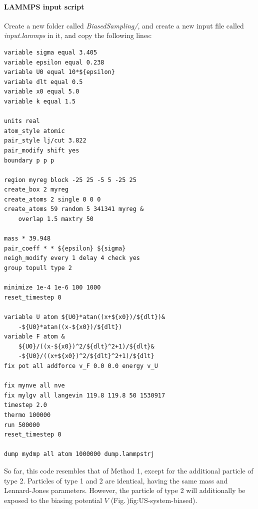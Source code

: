 \documentclass[9pt,tutorial]{livecoms}
\begin{document}
\paragraph{LAMMPS input script}
Create a new folder called \textit{BiasedSampling/}, and create a new input file called \textit{input.lammps} in it, and copy the following lines:
{\normalsize \begin{verbatim}
variable sigma equal 3.405
variable epsilon equal 0.238
variable U0 equal 10*${epsilon}
variable dlt equal 0.5
variable x0 equal 5.0
variable k equal 1.5

units real
atom_style atomic
pair_style lj/cut 3.822
pair_modify shift yes
boundary p p p

region myreg block -25 25 -5 5 -25 25
create_box 2 myreg
create_atoms 2 single 0 0 0
create_atoms 59 random 5 341341 myreg &
    overlap 1.5 maxtry 50

mass * 39.948
pair_coeff * * ${epsilon} ${sigma}
neigh_modify every 1 delay 4 check yes
group topull type 2

minimize 1e-4 1e-6 100 1000
reset_timestep 0

variable U atom ${U0}*atan((x+${x0})/${dlt})&
    -${U0}*atan((x-${x0})/${dlt})
variable F atom &
    ${U0}/((x-${x0})^2/${dlt}^2+1)/${dlt}&
    -${U0}/((x+${x0})^2/${dlt}^2+1)/${dlt}
fix pot all addforce v_F 0.0 0.0 energy v_U

fix mynve all nve
fix mylgv all langevin 119.8 119.8 50 1530917
timestep 2.0
thermo 100000
run 500000
reset_timestep 0

dump mydmp all atom 1000000 dump.lammpstrj
\end{verbatim}}
So far, this code resembles that of Method 1, except for the additional particle of type 2. Particles of type 1 and 2 
are identical, having the same mass and Lennard-Jones parameters. However, the particle of type 2 will additionally be exposed to the biasing potential $V$ (Fig.\,){fig:US-system-biased}).
\end{document}

